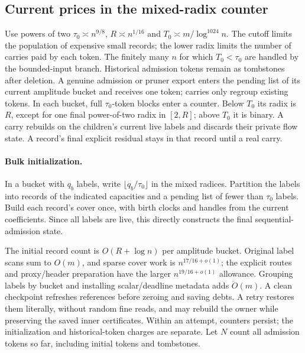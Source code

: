 \documentclass[11pt]{article}
\theoremstyle{remark}
\renewcommand{\O}{\ddot{O}}
\begin{document}
\subsection{Current prices in the mixed-radix counter}

Use powers of two $\tau_0\asymp n^{9/8}$, $R\asymp n^{1/16}$ and $T_0\asymp
m/\log^{1024} n$.
The cutoff limits the population of expensive small records; the lower radix
limits the number of carries paid by each token.
The finitely many $n$ for which $T_0<\tau_0$ are handled by the bounded-input
branch.
Historical admission tokens remain as tombstones after deletion.
A genuine admission or pruner export enters the pending list of its current
amplitude bucket and receives one token; carries only regroup existing tokens.
In each bucket, full $\tau_0$-token blocks enter a counter.
Below $T_0$ its radix is $R$, except for one final power-of-two radix in
$[2,R]$; above $T_0$ it is binary.
A carry rebuilds on the children's current live labels and discards their
private flow state.
A record's final explicit residual stays in that record until a real carry.

\paragraph{Bulk initialization.}
In a bucket with $q_b$ labels, write $\lfloor q_b/\tau_0\rfloor$ in the mixed
radices.
Partition the labels into records of the indicated capacities and a pending list
of fewer than $\tau_0$ labels.
Build each record's cover once, with birth clocks and handles from the current
coefficients.
Since all labels are live, this directly constructs the final
sequential-admission state.

The initial record count is $O(R+\log n)$ per amplitude bucket.
Original label scans sum to $O(m)$, and sparse cover work is
$n^{17/16+o(1)}$; the explicit routes and proxy/header preparation have
the larger $n^{19/16+o(1)}$ allowance.
Grouping labels by bucket and installing scalar/deadline metadata adds
$\O(m)$.
A clean checkpoint refreshes references before zeroing and saving debts.
A retry restores them literally, without random fine reads, and may rebuild the
owner while preserving the saved inner certificates.
Within an attempt, counters persist; the initialization and historical-token
charges are separate.
Let $N$ count all admission tokens so far, including initial tokens and
tombstones.
\end{document}
